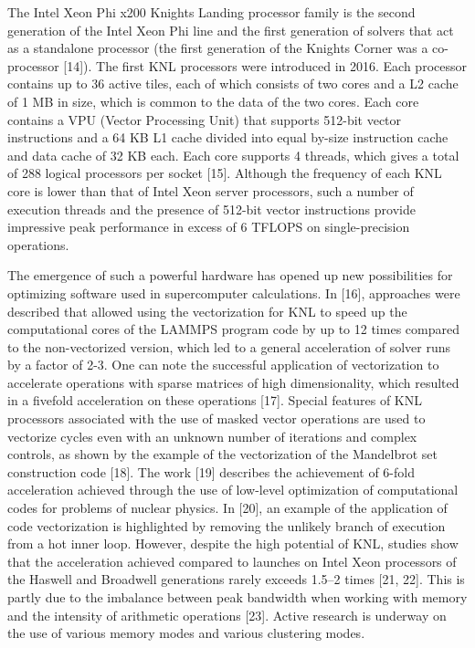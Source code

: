 \documentclass[
11pt,%
tightenlines,%
twoside,%
onecolumn,%
nofloats,%
nobibnotes,%
nofootinbib,%
superscriptaddress,%
noshowpacs,%
centertags]%
{revtex4}
\begin{document}
The Intel Xeon Phi x200 Knights Landing processor family is the second generation of the Intel Xeon Phi line and the first generation of solvers that act as a standalone processor (the first generation of the Knights Corner was a co-processor [14]). The first KNL processors were introduced in 2016. Each processor contains up to 36 active tiles, each of which consists of two cores and a L2 cache of 1 MB in size, which is common to the data of the two cores. Each core contains a VPU (Vector Processing Unit) that supports 512-bit vector instructions and a 64 KB L1 cache divided into equal by-size instruction cache and data cache of 32 KB each. Each core supports 4 threads, which gives a total of 288 logical processors per socket [15]. Although the frequency of each KNL core is lower than that of Intel Xeon server processors, such a number of execution threads and the presence of 512-bit vector instructions provide impressive peak performance in excess of 6 TFLOPS on single-precision operations.

The emergence of such a powerful hardware has opened up new possibilities for optimizing software used in supercomputer calculations. In [16], approaches were described that allowed using the vectorization for KNL to speed up the computational cores of the LAMMPS program code by up to 12 times compared to the non-vectorized version, which led to a general acceleration of solver runs by a factor of 2-3. One can note the successful application of vectorization to accelerate operations with sparse matrices of high dimensionality, which resulted in a fivefold acceleration on these operations [17]. Special features of KNL processors associated with the use of masked vector operations are used to vectorize cycles even with an unknown number of iterations and complex controls, as shown by the example of the vectorization of the Mandelbrot set construction code [18]. The work [19] describes the achievement of 6-fold acceleration achieved through the use of low-level optimization of computational codes for problems of nuclear physics. In [20], an example of the application of code vectorization is highlighted by removing the unlikely branch of execution from a hot inner loop.
However, despite the high potential of KNL, studies show that the acceleration achieved compared to launches on Intel Xeon processors of the Haswell and Broadwell generations rarely exceeds 1.5–2 times [21, 22]. This is partly due to the imbalance between peak bandwidth when working with memory and the intensity of arithmetic operations [23]. Active research is underway on the use of various memory modes and various clustering modes.
\end{document}
